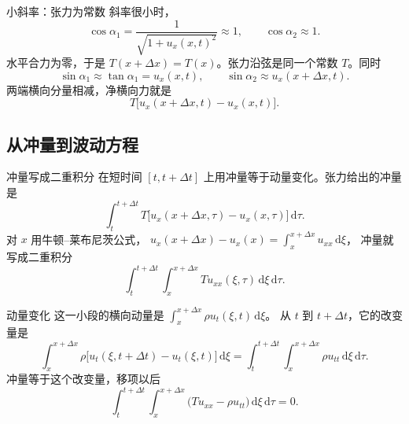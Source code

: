 \documentclass[fontset=windows, chinese, 10pt, xcolor=dvipsnames]{beamer}
\begin{document}
\begin{frame}{小斜率：张力为常数}
  斜率很小时，
  \begin{equation*}
    \cos\alpha_1=\frac{1}{\sqrt{1+u_x(x,t)^2}}\approx 1,
    \qquad \cos\alpha_2\approx 1.
  \end{equation*}
  水平合力为零，于是 $T(x+\Delta x)=T(x)$。张力沿弦是同一个常数 $T$。同时
  \begin{equation*}
    \sin\alpha_1\approx\tan\alpha_1=u_x(x,t),
    \qquad
    \sin\alpha_2\approx u_x(x+\Delta x,t).
  \end{equation*}
  两端横向分量相减，净横向力就是
  \begin{equation*}
    T\bigl[u_x(x+\Delta x,t)-u_x(x,t)\bigr].
  \end{equation*}
\end{frame}

\subsection{从冲量到波动方程}

\begin{frame}{冲量写成二重积分}
  在短时间 $[t,t+\Delta t]$ 上用冲量等于动量变化。张力给出的冲量是
  \begin{equation*}
    \int_t^{t+\Delta t}
      T\bigl[u_x(x+\Delta x,\tau)-u_x(x,\tau)\bigr]\,\mathrm{d}\tau.
  \end{equation*}
  对 $x$ 用牛顿--莱布尼茨公式，
  $u_x(x+\Delta x)-u_x(x)=\int_x^{x+\Delta x}u_{xx}\,\mathrm{d}\xi$，
  冲量就写成二重积分
  \begin{equation*}
    \int_t^{t+\Delta t}\int_x^{x+\Delta x} T u_{xx}(\xi,\tau)\,\mathrm{d}\xi\,\mathrm{d}\tau.
  \end{equation*}
\end{frame}

\begin{frame}{动量变化}
  这一小段的横向动量是 $\displaystyle\int_x^{x+\Delta x}\rho u_t(\xi,t)\,\mathrm{d}\xi$。
  从 $t$ 到 $t+\Delta t$，它的改变量是
  \begin{equation*}
    \int_x^{x+\Delta x}\rho\bigl[u_t(\xi,t+\Delta t)-u_t(\xi,t)\bigr]\,\mathrm{d}\xi
    =\int_t^{t+\Delta t}\int_x^{x+\Delta x}\rho u_{tt}\,\mathrm{d}\xi\,\mathrm{d}\tau.
  \end{equation*}
  冲量等于这个改变量，移项以后
  \begin{equation*}
    \int_t^{t+\Delta t}\int_x^{x+\Delta x}
      \bigl(T u_{xx}-\rho u_{tt}\bigr)\,\mathrm{d}\xi\,\mathrm{d}\tau=0.
  \end{equation*}
\end{frame}
\end{document}
